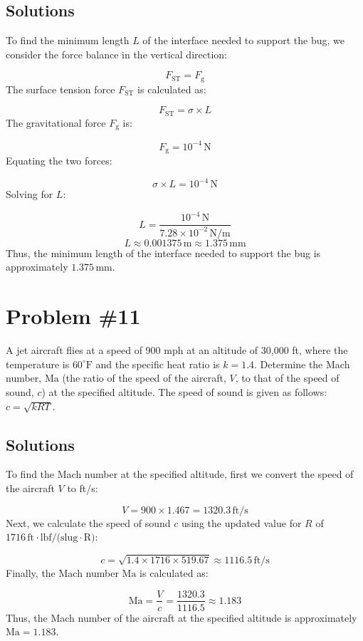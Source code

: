 \documentclass{article}
\begin{document}
\subsection*{Solutions}
To find the minimum length \(L\) of the interface needed to support the bug, we consider the force balance in the vertical direction:

\[
F_{\text{ST}} = F_{\text{g}}
\]
The surface tension force \(F_{\text{ST}}\) is calculated as:

\[
F_{\text{ST}} = \sigma \times L
\]
The gravitational force \(F_{\text{g}}\) is:

\[
F_{\text{g}} = 10^{-4} \, \text{N}
\]
Equating the two forces:

\[
\sigma \times L = 10^{-4} \, \text{N}
\]
Solving for \(L\):

\[
L = \frac{{10^{-4} \, \text{N}}}{{7.28 \times 10^{-2} \, \text{N/m}}}
\]
\[
L \approx 0.001375 \, \text{m} \approx 1.375 \, \text{mm}
\]
Thus, the minimum length of the interface needed to support the bug is approximately \(1.375 \, \text{mm}\).
\newpage
\section*{Problem \#11}

A jet aircraft flies at a speed of 900 mph at an altitude of 30,000 ft, where the temperature is \(60^\circ \text{F}\) and the specific heat ratio is \(k=1.4\). Determine the Mach number, \( \text{Ma} \) (the ratio of the speed of the aircraft, \( V \), to that of the speed of sound, \( c \)) at the specified altitude. The speed of sound is given as follows: \( c = \sqrt{kRT} \).

\subsection*{Solutions}

To find the Mach number at the specified altitude, first we convert the speed of the aircraft \( V \) to ft/s:

\[
V = 900 \times 1.467 = 1320.3 \, \text{ft/s}
\]
Next, we calculate the speed of sound \( c \) using the updated value for \( R \) of \( 1716 \, \text{ft} \cdot \text{lbf/(slug} \cdot \text{R)} \):

\[
c = \sqrt{1.4 \times 1716 \times 519.67} \approx 1116.5 \, \text{ft/s}
\]
Finally, the Mach number \( \text{Ma} \) is calculated as:

\[
\text{Ma} = \frac{V}{c} = \frac{1320.3}{1116.5} \approx 1.183
\]
Thus, the Mach number of the aircraft at the specified altitude is approximately \( \text{Ma} = 1.183 \).
\newpage
\end{document}
